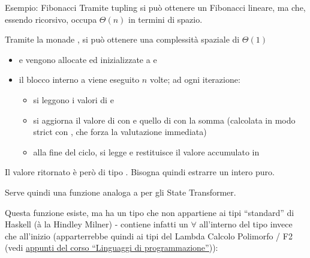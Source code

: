 \begin{gframe}{Esempio: Fibonacci}
Tramite tupling si può ottenere un Fibonacci lineare, ma che, essendo ricorsivo, occupa $\Theta(n)$ in termini di spazio.

Tramite la monade , si può ottenere una complessità spaziale di $\Theta(1)$


\begin{itemize}
    \item {} e  vengono allocate ed inizializzate a  e 
    \item il blocco interno a  viene eseguito $n$ volte; ad ogni iterazione:
        \begin{itemize}
            \item si leggono i valori di  e 
            \item si aggiorna il valore di  con  e quello di  con la somma (calcolata in modo strict con \code{\$!}, che forza la valutazione immediata) 
            \item alla fine del ciclo, si legge e restituisce il valore accumulato in 
        \end{itemize}
\end{itemize}
\end{gframe}
Il valore ritornato è però di tipo . Bisogna quindi estrarre un intero puro.

Serve quindi una funzione  analoga a  per gli State Transformer.

Questa funzione esiste, ma ha un tipo che non appartiene ai tipi ``standard'' di Haskell (à la Hindley Milner) - contiene infatti un $\forall$ all'interno del tipo invece che all'inizio (apparterrebbe quindi ai tipi del Lambda Calcolo Polimorfo / F2 (vedi \href{https://raw.githubusercontent.com/AglaiaNorza/notes-ig/main/terzo%20anno/linguaggi%20di%20programmazione.pdf}{\underline{appunti del corso ``Linguaggi di programmazione''}})):

